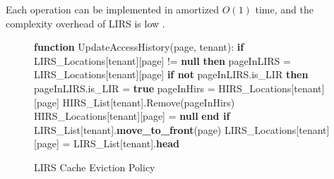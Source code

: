 Each operation can be implemented in amortized $O(1)$ time, and the complexity overhead 
of LIRS is low \cite{lirs-article}.

\begin{figure}[htbp]
    \centering
    \begin{minipage}{\linewidth}
    \begin{algorithm}[H]
        \caption{LIRS Cache Eviction Policy}
        \begin{algorithmic}
            \STATE \textbf{function} UpdateAccessHistory(page, tenant):
            \STATE \hspace{\algorithmicindent} \textbf{if} LIRS\_Locations[tenant][page] != \textbf{null} \textbf{then}
            \STATE \hspace{\algorithmicindent} \hspace{\algorithmicindent} pageInLIRS = LIRS\_Locations[tenant][page]
            \STATE \hspace{\algorithmicindent} \hspace{\algorithmicindent} \textbf{if not} pageInLIRS.is\_LIR \textbf{then}
            \STATE \hspace{\algorithmicindent} \hspace{\algorithmicindent} \hspace{\algorithmicindent} pageInLIRS.is\_LIR = \textbf{true}
            \STATE \hspace{\algorithmicindent} \hspace{\algorithmicindent} \hspace{\algorithmicindent} pageInHirs = HIRS\_Locations[tenant][page]
            \STATE \hspace{\algorithmicindent} \hspace{\algorithmicindent} \hspace{\algorithmicindent} HIRS\_List[tenant].Remove(pageInHirs)
            \STATE \hspace{\algorithmicindent} \hspace{\algorithmicindent} \hspace{\algorithmicindent} HIRS\_Locations[tenant][page] = \textbf{null}
            \STATE \hspace{\algorithmicindent} \hspace{\algorithmicindent} \textbf{end if}
            \STATE \hspace{\algorithmicindent} \hspace{\algorithmicindent} LIRS\_List[tenant].\textbf{move\_to\_front}(page)
            \STATE \hspace{\algorithmicindent} \hspace{\algorithmicindent} LIRS\_Locations[tenant][page] = LIRS\_List[tenant].\textbf{head}

\end{algorithmic}
\end{algorithm}
\end{minipage}
\end{figure}

